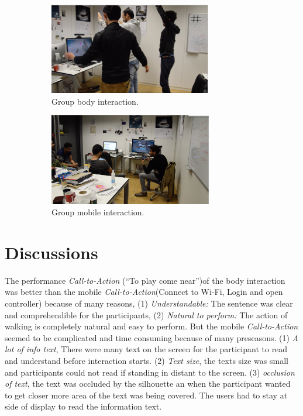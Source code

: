 \begin{figure}[H]
    \centering
    \begin{subfigure}[H]{0.45\textwidth}
        \centering
        \includegraphics[width=\textwidth,height=4cm]{Figures/6/groupBody}
        \caption{Group body interaction.}
        \label{fig:groupbody}
    \end{subfigure}
    \begin{subfigure}[H]{0.45\textwidth}
        \centering
        \includegraphics[width=\textwidth,height=4cm]{Figures/6/groupMobile}
        \caption{Group mobile interaction.}
        \label{fig:groupmobile}
    \end{subfigure}
    \caption{}
    \label{fig:Focus_group_room_interactive}
\end{figure}


\section{Discussions}

The performance \emph{Call-to-Action} (``To play come near'')of the body interaction was better than the mobile \emph{Call-to-Action}(Connect to Wi-Fi, Login and open controller) because of many reasons, (1) \emph{Understandable:} The sentence was clear and comprehendible for the participants,  (2) \emph{Natural to perform:} The action of walking is completely natural and easy to perform. But the mobile \emph{Call-to-Action} seemed to be complicated and time consuming because of many preseasons. (1) \emph{A lot of info text}, There were many text on the screen for the participant to read and understand before interaction starts. (2) \emph{Text size}, the texts size was small and participants could not read if standing in distant to the screen. (3) \emph{occlusion of text}, the text was occluded by the silhouette an when the participant wanted to get closer more area of the text was being covered. The users had to stay at side of display to read the information text. 

